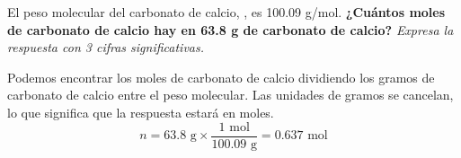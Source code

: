 El peso molecular del carbonato de calcio, , es 100.09 g/mol.
\textbf{¿Cuántos moles de carbonato de calcio hay en 63.8 g de carbonato de calcio?}
\emph{Expresa la respuesta con 3 cifras significativas.}

\begin{solutionbox}{4cm}
    Podemos encontrar los moles de carbonato de calcio dividiendo los gramos de carbonato de calcio entre el peso molecular. Las unidades de gramos se cancelan, lo que significa que la respuesta estará en moles.
    \[ n =  63.8 \text{ g} \times \frac{1 \text{ mol}}{100.09 \text{ g}} = 0.637 \text{ mol} \]
\end{solutionbox}
